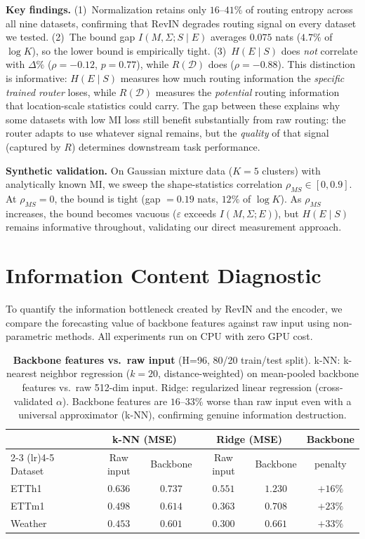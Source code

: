 \documentclass{article}
\begin{document}
\textbf{Key findings.} (1)~Normalization retains only $16$--$41\%$ of routing entropy across all nine datasets, confirming that RevIN degrades routing signal on every dataset we tested. (2)~The bound gap $I(M,\Sigma; S \mid E)$ averages $0.075$ nats ($4.7\%$ of $\log K$), so the lower bound is empirically tight. (3)~$H(E \mid S)$ does \emph{not} correlate with $\Delta\%$ ($\rho{=}{-}0.12$, $p{=}0.77$), while $R(\mathcal{D})$ does ($\rho{=}{-}0.88$). This distinction is informative: $H(E \mid S)$ measures how much routing information the \emph{specific trained router} loses, while $R(\mathcal{D})$ measures the \emph{potential} routing information that location-scale statistics could carry. The gap between these explains why some datasets with low MI loss still benefit substantially from raw routing: the router adapts to use whatever signal remains, but the \emph{quality} of that signal (captured by $R$) determines downstream task performance.

\textbf{Synthetic validation.} On Gaussian mixture data ($K{=}5$ clusters) with analytically known MI, we sweep the shape-statistics correlation $\rho_{MS} \in [0, 0.9]$. At $\rho_{MS}{=}0$, the bound is tight (gap $= 0.19$ nats, $12\%$ of $\log K$). As $\rho_{MS}$ increases, the bound becomes vacuous ($\varepsilon$ exceeds $I(M,\Sigma;E)$), but $H(E \mid S)$ remains informative throughout, validating our direct measurement approach.

\section{Information Content Diagnostic}
\label{app:diagnostic}

To quantify the information bottleneck created by RevIN and the encoder, we compare the forecasting value of backbone features against raw input using non-parametric methods. All experiments run on CPU with zero GPU cost.

\begin{table}[!htbp]
\centering
\caption{\textbf{Backbone features vs.\ raw input} (H=96, 80/20 train/test split). k-NN: k-nearest neighbor regression ($k{=}20$, distance-weighted) on mean-pooled backbone features vs.\ raw 512-dim input. Ridge: regularized linear regression (cross-validated $\alpha$). Backbone features are $16$--$33\%$ worse than raw input even with a universal approximator (k-NN), confirming genuine information destruction.}
\label{tab:diagnostic}
\small
\begin{tabular}{@{}lccccc@{}}
\toprule
& \multicolumn{2}{c}{k-NN (MSE)} & \multicolumn{2}{c}{Ridge (MSE)} & Backbone \\
\cmidrule(lr){2-3} \cmidrule(lr){4-5}
Dataset & Raw input & Backbone & Raw input & Backbone & penalty \\
\midrule
ETTh1   & $0.636$ & $0.737$ & $0.551$ & $1.230$ & $+16\%$ \\
ETTm1   & $0.498$ & $0.614$ & $0.363$ & $0.708$ & $+23\%$ \\
Weather & $0.453$ & $0.601$ & $0.300$ & $0.661$ & $+33\%$ \\
\bottomrule
\end{tabular}
\end{table}
\end{document}
